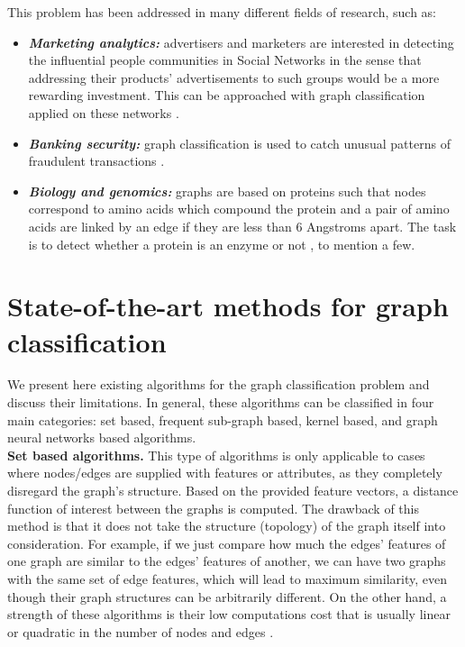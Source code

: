 This problem has been addressed in many different fields of research, such as:
\begin{itemize}
    \item \textbf{\emph{Marketing analytics:}} advertisers and marketers  are interested in detecting the influential people communities in Social Networks in the sense that addressing their products' advertisements to such groups would be a more rewarding investment. This can be approached with graph classification applied on these networks \citep{marketing_analytics}.
    \item \textbf{\emph{Banking security:}} graph classification is used to catch unusual patterns of fraudulent transactions \citep{banking_security}.
    \item \textbf{\emph{Biology and genomics:}} graphs are based on proteins such that nodes correspond
to amino acids which compound the protein and a pair of amino acids are linked by an edge if they are less than 6 Angstroms apart. The task is to detect whether a protein is an enzyme or not \citep{protein_application}, to mention a few.
\end{itemize}

\section{State-of-the-art methods for graph classification}
We  present here existing algorithms for the graph classification problem and discuss their limitations. In general, these algorithms can be classified in four main categories: set based, frequent sub-graph based, kernel based, and graph neural networks based algorithms.\\

\noindent\textbf{Set based algorithms.} This type of algorithms is only applicable to cases where nodes/edges are supplied with features or attributes, as they completely disregard the graph's structure. Based on the provided feature vectors, a distance function of interest between the graphs is computed. %
The drawback of this method is that it does not take the structure (topology) of the graph itself into consideration. For example, if we just compare how much the edges' features of one graph are similar to the edges' features of another, we can have two graphs with the same set of edge features, which will lead to maximum similarity, even though their graph structures can be arbitrarily different. %
On the other hand, a strength of these algorithms is their low computations cost that is usually linear or quadratic in the number of nodes and edges \citep{graphlet_kernel}.\\
 
